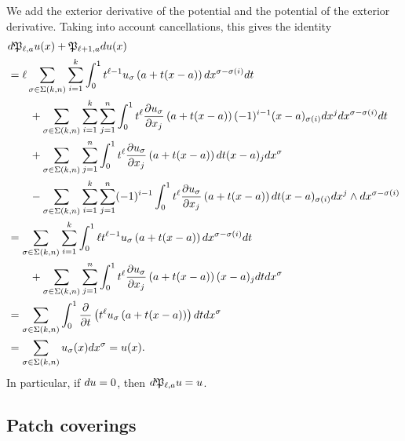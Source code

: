 \documentclass[a4paper]{article}
\begin{document}
We add the exterior derivative of the potential and the potential of the exterior derivative.
Taking into account cancellations, this gives the identity 
\begin{align*}
    &
    d {\mathfrak P}_{\ell,a} u(x)
    +
    {\mathfrak P}_{\ell+1,a} d u(x)
    \\&
    =
    \ell
    \sum_{\sigma \in \Sigma(k,n)} \sum_{i=1}^{k}
    \int_{0}^{1} 
    t^{\ell-1} u_{\sigma}\left(a+t(x-a)\right) dx^{\sigma-\sigma(i)} dt 
    \\&\qquad
    + 
    \sum_{\sigma \in \Sigma(k,n)} \sum_{i=1}^{k} \sum_{j=1}^{n}
    \int_{0}^{1} 
    t^{\ell} \frac{ \partial u_{\sigma} }{\partial x_{j}}\left(a+t(x-a)\right) (-1)^{i-1} (x-a)_{\sigma(i) } dx^{j} dx^{\sigma-\sigma(i)} dt 
    \\&\qquad
    +
    \sum_{\sigma \in \Sigma(k,n)} \sum_{j=1}^{n}
    \int_{0}^{1} t^{\ell} \frac{ \partial u_{\sigma} }{\partial x_{j}}\left(a+t(x-a)\right) dt (x-a)_{j}
    dx^{\sigma}
    \\&\qquad
    - 
    \sum_{\sigma \in \Sigma(k,n)} \sum_{i=1}^{k} \sum_{j=1}^{n}
    (-1)^{i-1}
    \int_{0}^{1} t^{\ell} \frac{ \partial u_{\sigma} }{\partial x_{j}}\left(a+t(x-a)\right) dt 
    (x-a)_{\sigma(i)} dx^{j} \wedge dx^{\sigma-\sigma(i)}
    \\&
    =
    \sum_{\sigma \in \Sigma(k,n)} \sum_{i=1}^{k}
    \int_{0}^{1} 
    \ell t^{\ell-1} u_{\sigma}\left(a+t(x-a)\right) dx^{\sigma-\sigma(i)} dt 
    \\&\qquad
    +
    \sum_{\sigma \in \Sigma(k,n)} \sum_{j=1}^{n}
    \int_{0}^{1} t^{\ell} \frac{ \partial u_{\sigma} }{\partial x_{j}}\left(a+t(x-a)\right) (x-a)_{j} dt
    dx^{\sigma}
    \\&
    =
    \sum_{\sigma \in \Sigma(k,n)} 
    \int_{0}^{1} \frac{\partial}{\partial t} \left( t^{\ell} u_{\sigma}\left(a+t(x-a)\right) \right) dt dx^{\sigma}
    \\&
    =
    \sum_{\sigma \in \Sigma(k,n)} 
    u_{\sigma}(x) dx^{\sigma}
    =
    u(x)
    .
\end{align*}
In particular, if $d u = 0$, then $d {\mathfrak P}_{\ell,a} u = u$.






\subsection{Patch coverings}
\end{document}
